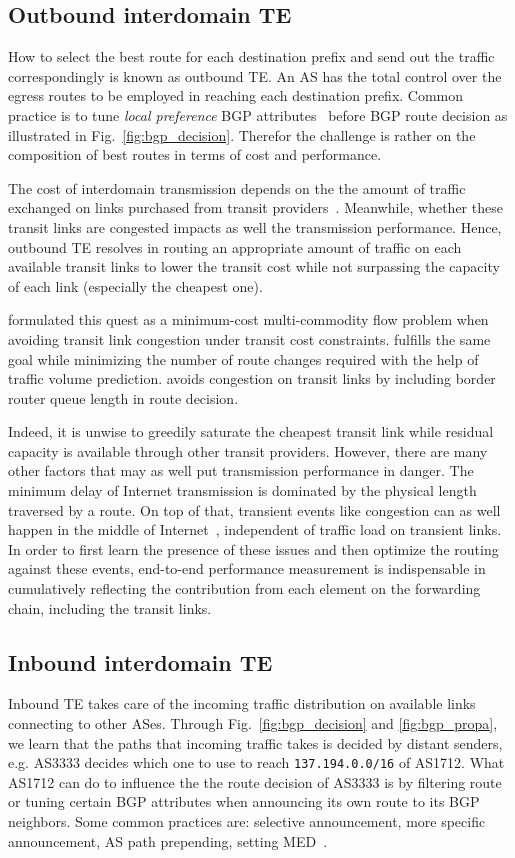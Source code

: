 \subsection{Outbound interdomain TE}
How to select the best route for each destination prefix and send out the traffic correspondingly is known as outbound TE. 
An AS has the total control over the egress routes to be employed in reaching each destination prefix. Common practice is to tune \textit{local preference} BGP attributes~\cite{Wang2008} before BGP route decision as illustrated in Fig.~\ref{fig:bgp_decision}. 
Therefor the challenge is rather on the composition of best routes in terms of cost and performance.

The cost of interdomain transmission depends on the the amount of traffic exchanged on links purchased from transit providers~\cite{drpeering-95th}.
Meanwhile, whether these transit links are congested impacts as well the transmission performance.
Hence, outbound TE resolves in routing an appropriate amount of traffic on each available transit links to lower the transit cost while not surpassing the capacity of each link (especially the cheapest one).

\citet{Goldenberg2004} formulated this quest as a minimum-cost multi-commodity flow problem when avoiding transit link congestion under transit cost constraints.
\citet{Uhlig2004b} fulfills the same goal while minimizing the number of route changes required with the help of traffic volume prediction.
\citet{Zhu2014} avoids congestion on transit links by including border router queue length in route decision.

Indeed, it is unwise to greedily saturate the cheapest transit link while residual capacity is available through other transit providers.
However, there are many other factors that may as well put transmission performance in danger.
The minimum delay of Internet transmission is dominated by the physical length traversed by a route. 
On top of that, transient events like congestion can as well happen in the middle of Internet~\cite{Akella2003, Luckie2014}, independent of traffic load on transient links.
In order to first learn the presence of these issues and then optimize the routing against these events, end-to-end performance measurement is indispensable in cumulatively reflecting the contribution from each element on the forwarding chain, including the transit links.


\subsection{Inbound interdomain TE}
Inbound TE takes care of the incoming traffic distribution on available links connecting to other ASes.
Through Fig.~\ref{fig:bgp_decision} and \ref{fig:bgp_propa}, we learn that the paths that incoming traffic takes is decided by distant senders, e.g. AS3333 decides which one to use to reach \texttt{137.194.0.0/16} of AS1712.
What AS1712 can do to influence the the route decision of AS3333 is by 
filtering route or tuning certain BGP attributes when announcing its own route to its BGP neighbors.
Some common practices are: selective announcement, more specific announcement, AS path prepending, setting \ac{MED}~\cite{Wang2008}.

